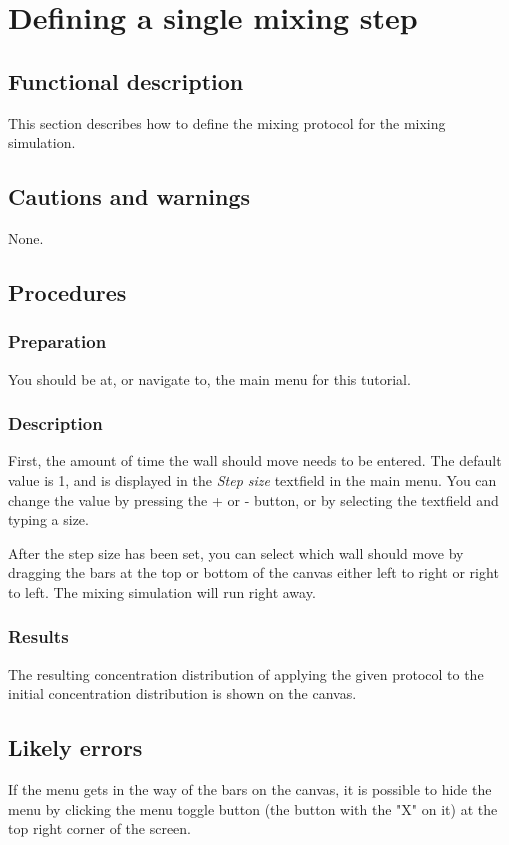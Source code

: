 \section{Defining a single mixing step}
\label{sec:singleStepMix}

\subsection{Functional description}
This section describes how to define the mixing protocol for the mixing simulation.

\subsection{Cautions and warnings}
None.

\subsection{Procedures}
\subsubsection{Preparation}
You should be at, or navigate to, the main menu for this tutorial.

\subsubsection{Description}
First, the amount of time the wall should move needs to be entered. The default value is 1, and is displayed in the \emph{Step size} textfield in the main menu. You can change the value by pressing the + or - button, or by selecting the textfield and typing a size.

After the step size has been set, you can select which wall should move by dragging the bars at the top or bottom of the canvas either left to right or right to left. The mixing simulation will run right away.

\subsubsection{Results}
The resulting concentration distribution of applying the given protocol to the initial concentration distribution is shown on the canvas.

\subsection{Likely errors}
If the menu gets in the way of the bars on the canvas, it is possible to hide the menu by clicking the menu toggle button (the button with the "X" on it) at the top right corner of the screen.

